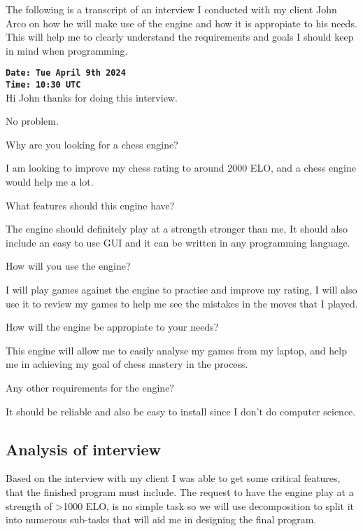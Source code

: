 The following is a transcript of an interview I
conducted with my client John Arco on how he will make use of the
engine and how it is appropiate to his needs. This will 
help me to clearly understand the requirements and goals I
should keep in mind when programming.

\begin{tcolorbox}
\textbf{\texttt {Date: Tue April 9th 2024}}\\
\textbf{\texttt {Time: 10:30 UTC}}\\
 Hi John thanks for doing this interview. \par
{} No problem. \par 
{} Why are you looking for a chess engine?\par
{} I am looking to improve my
chess rating to around 2000 ELO, and a chess engine would
help me a lot.\par
{} What features should this
engine have? \par
{} The engine should definitely
play at a strength stronger than me, It should also include
an easy to use GUI and it can be written in any programming
language.\par
{} How will you use the
engine? \par
{} I will play games against the 
engine to practise and improve my rating, I will also use it
to review my games to help me see the mistakes in the moves 
that I played. \par
{} How will the engine be 
appropiate to your needs? \par
{} This engine will allow me to 
easily analyse my games from my laptop, and help me in 
achieving my goal of chess mastery in the process. \par
{} Any other requirements for
the engine? \par
{} It should be reliable and also 
be easy to install since I don't do computer science. \par
\end{tcolorbox}


\subsection*{Analysis of interview}
Based on the interview with my client I was able to get 
some critical features, that the finished program must
include. The request to have the engine play at a strength
of >1000 ELO, is no simple task so we will use decomposition
to split it into numerous sub-tasks that will aid me in 
designing the final program. \\

